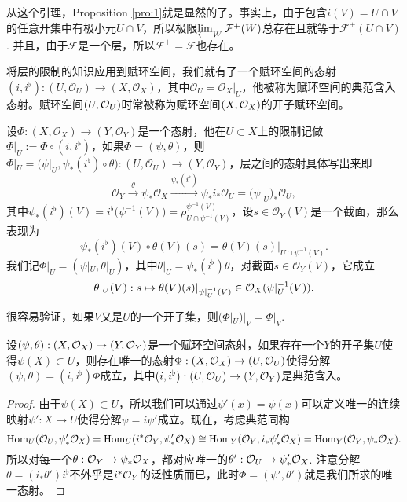 从这个引理，Proposition \ref{pro:1}就是显然的了。事实上，由于包含$i(V)=U\cap V$的任意开集中有极小元$U\cap V$，所以极限$\varprojlim_W \mathcal{F}^+(W)$总存在且就等于$\mathcal{F}^+(U\cap V)$. 并且，由于$\mathcal{F}$是一个层，所以$\mathcal{F}^+=\mathcal{F}$也存在。

\begin{para}
将层的限制的知识应用到赋环空间，我们就有了一个赋环空间的态射$(i,i^\flat):(U,\mathcal{O}_U)\to (X,\mathcal{O}_X)$，其中$\mathcal{O}_U=\mathcal{O}_X|_U$，他被称为赋环空间的典范含入态射。赋环空间$(U,\mathcal{O}_U)$时常被称为赋环空间$(X,\mathcal{O}_X)$的开子赋环空间。

设$\Phi:(X,\mathcal{O}_X)\to (Y,\mathcal{O}_Y)$是一个态射，他在$U\subset X$上的限制记做$\Phi|_U:=\Phi\circ (i,i^\flat)$，如果$\Phi=(\psi,\theta)$，则$\Phi|_U=\bigl(\psi|_U, \psi_*(i^\flat) \circ \theta\bigr):(U,\mathcal{O}_U)\to (Y,\mathcal{O}_Y)$，层之间的态射具体写出来即
\[
	\mathcal{O}_Y\xrightarrow{\theta} \psi_*\mathcal{O}_X \xrightarrow{\psi_*(i^\flat)} \psi_*i_*\mathcal{O}_U=\bigl(\psi|_U\bigr)_*\mathcal{O}_U,
\]
其中$\psi_*(i^\flat)(V)=i^\flat\bigl(\psi^{-1}(V)\bigr)=\rho^{\psi^{-1}(V)}_{U\cap \psi^{-1}(V)}$，设$s\in \mathcal{O}_Y(V)$是一个截面，那么表现为
\[
	\psi_*(i^\flat)(V)\circ \theta(V)(s)=\theta(V)(s)|_{U\cap \psi^{-1}(V)}.
\]
我们记$\Phi|_U=(\psi|_U,\theta|_U)$，其中$\theta|_U=\psi_*(i^\flat)\theta$，对截面$s\in \mathcal{O}_Y(V)$，它成立
\[
	\theta|_U(V):s\mapsto \theta(V)(s)|_{\psi|_U^{-1}(V)}\in \mathcal{O}_X(\psi|_U^{-1}(V)).
\]

很容易验证，如果$V$又是$U$的一个开子集，则$(\Phi|_U)|_V=\Phi|_V$.
\end{para}

\begin{pro}\label{pro:1.20}
设$(\psi,\theta):(X,\mathcal{O}_X)\to (Y,\mathcal{O}_Y)$是一个赋环空间态射，如果存在一个$Y$的开子集$U$使得$\psi(X)\subset U$，则存在唯一的态射$\Phi:(X,\mathcal{O}_X)\to (U,\mathcal{O}_U)$使得分解$(\psi,\theta)=(i,i^\flat)\Phi$成立，其中$(i,i^\flat):(U,\mathcal{O}_U)\to (Y,\mathcal{O}_Y)$是典范含入。
\end{pro}

\begin{proof}
由于$\psi(X)\subset U$，所以我们可以通过$\psi'(x)=\psi(x)$可以定义唯一的连续映射$\psi':X\to U$使得分解$\psi=i\psi'$成立。现在，考虑典范同构
\[
	\operatorname{Hom}_{U}(\mathcal{O}_U,\psi'_*\mathcal{O}_X)=\operatorname{Hom}_{U}(i^*\mathcal{O}_Y,\psi'_*\mathcal{O}_X)\cong \operatorname{Hom}_{Y}(\mathcal{O}_Y,i_*\psi'_*\mathcal{O}_X)=\operatorname{Hom}_{Y}(\mathcal{O}_Y,\psi_*\mathcal{O}_X).
\]
所以对每一个$\theta:\mathcal{O}_Y\to \psi_*\mathcal{O}_X$，都对应唯一的$\theta':\mathcal{O}_U\to \psi'_*\mathcal{O}_X$. 注意分解$\theta=(i_*\theta')i^\flat$不外乎是$i^*\mathcal{O}_Y$的泛性质而已，此时$\Phi=(\psi',\theta')$就是我们所求的唯一态射。
\end{proof}

